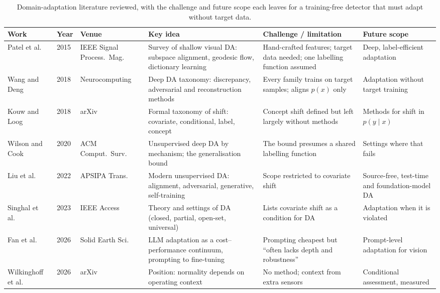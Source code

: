 \documentclass[conference,a4paper]{IEEEtran}
\begin{document}
\begin{table}[!t]
\caption{Domain-adaptation literature reviewed, with the challenge and future
scope each leaves for a training-free detector that must adapt without target
data.}
\label{tbl:lit-da}
\centering
\footnotesize
\begin{tabularx}{\textwidth}{@{}W{2.6cm} l W{2.3cm} Z Z Z@{}}
\toprule
\textbf{Work} & \textbf{Year} & \textbf{Venue} & \textbf{Key idea} & \textbf{Challenge / limitation} & \textbf{Future scope} \\
\midrule
Patel et al.\ \cite{patel2015visual} & 2015 & IEEE Signal Process.\ Mag. & Survey of shallow visual DA: subspace alignment, geodesic flow, dictionary learning & Hand-crafted features; target data needed; one labelling function assumed & Deep, label-efficient adaptation \\
Wang and Deng \cite{wang2018deep} & 2018 & Neurocomputing & Deep DA taxonomy: discrepancy, adversarial and reconstruction methods & Every family trains on target samples; aligns $p(x)$ only & Adaptation without target training \\
Kouw and Loog \cite{kouw2018introduction} & 2018 & arXiv & Formal taxonomy of shift: covariate, conditional, label, concept & Concept shift defined but left largely without methods & Methods for shift in $p(y\mid x)$ \\
Wilson and Cook \cite{wilson2020survey} & 2020 & ACM Comput.\ Surv. & Unsupervised deep DA by mechanism; the generalisation bound & The bound presumes a shared labelling function & Settings where that fails \\
Liu et al.\ \cite{liu2022deep} & 2022 & APSIPA Trans. & Modern unsupervised DA: alignment, adversarial, generative, self-training & Scope restricted to covariate shift & Source-free, test-time and foundation-model DA \\
Singhal et al.\ \cite{singhal2023domain} & 2023 & IEEE Access & Theory and settings of DA (closed, partial, open-set, universal) & Lists covariate shift as a condition for DA & Adaptation when it is violated \\
Fan et al.\ \cite{fan2026llm} & 2026 & Solid Earth Sci. & LLM adaptation as a cost--performance continuum, prompting to fine-tuning & Prompting cheapest but ``often lacks depth and robustness'' & Prompt-level adaptation for vision \\
Wilkinghoff et al.\ \cite{wilkinghoff2026context} & 2026 & arXiv & Position: normality depends on operating context & No method; context from extra sensors & Conditional assessment, measured \\

\end{tabularx}
\end{table}
\end{document}
